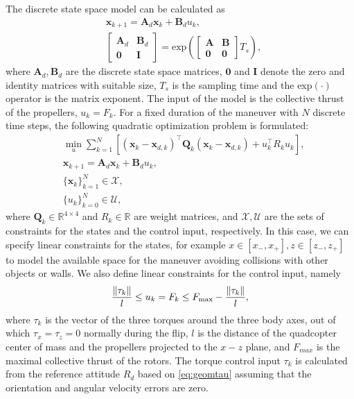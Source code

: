 The discrete state space model can be calculated as \cite{linearsys}
\begin{align}
    & \mathbf x_{k+1} = \mathbf A_d \mathbf x_k + \mathbf B_d u_k,\\
    & \begin{bmatrix} {\mathbf A_{d}} & {\mathbf B_{d}} \\ {\mathbf 0} & {\mathbf I} \end{bmatrix}= \mathrm{exp}\left({{\begin{bmatrix} \mathbf{A} & {\mathbf B} \\ \mathbf{0} & \mathbf{0} \end{bmatrix}}T_s}\right),
\end{align}
where $\mathbf A_d, \mathbf B_d$ are the discrete state space matrices, $\mathbf 0$ and $\mathbf I$ denote the zero and identity matrices with suitable size, $T_s$ is the sampling time and the exp$(\cdot)$ operator is the matrix exponent. The input of the model is the collective thrust of the propellers, $u_k=F_k$. For a fixed duration of the maneuver with $N$ discrete time steps, the following quadratic optimization problem is formulated:
\begin{subequations}\label{eq:quadprog}
    \begin{align}
        &\min_u \sum_{k=1}^N \left[ \left(\mathbf x_k-\mathbf x_{d,k}\right)^\top \mathbf Q_k  \left(\mathbf x_k-\mathbf x_{d,k}\right) + u_k^\top R_k u_k\right],\\
        &\mathbf x_{k+1} = \mathbf A_d \mathbf x_k +\mathbf B_d u_k,\\
        &\{ \mathbf x_{k}\}_{k=1}^N \in \mathcal{X},\\
        &\{u_{k}\}_{k=0}^N \in \mathcal{U},
    \end{align}
\end{subequations}
where $\mathbf Q_k\in \mathbb{R}^{4\times 4}$ and $R_k \in\mathbb{R}$ are weight matrices, and $\mathcal{X}, \mathcal{U}$ are the sets of constraints for the states and the control input, respectively. In this case, we can specify linear constraints for the states, for example $x\in[x_-,x_+], z\in[z_-, z_+]$ to model the available space for the maneuver avoiding collisions with other objects or walls. We also define linear constraints for the control input, namely
    \begin{align}
        \frac{\norm{\tau_k}}{l} \leq u_k = F_k \leq F_\mathrm{max}-\frac{\norm{\tau_k}}{l},
    \end{align}
where $\tau_k$ is the vector of the three torques around the three body axes, out of which $\tau_x=\tau_z=0$ normally during the flip, $l$ is the distance of the quadcopter center of mass and the propellers projected to the $x-z$ plane, and $F_{max}$ is the maximal collective thrust of the rotors. The torque control input $\tau_k$ is calculated from the reference attitude $R_d$ based on \eqref{eq:geomtau} assuming that the orientation and angular velocity errors are zero.

